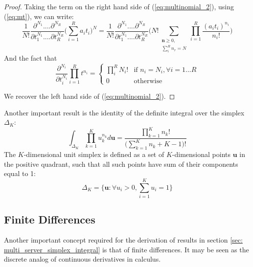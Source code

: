 \begin{proof}
    Taking the term on the right hand side of (\ref{eq:multinomial_2}), using (\ref{eq:mt}), we can write:
    \begin{equation}\label{eq:differentiation_filter}
        \frac{1}{N!} \frac{\partial^{N_1}....\partial^{N_R}}{\partial t_1^{N_1}....\partial t_R^{N_R}}\bigg( \sum_{i=1}^R a_i t_i \bigg)^N = \frac{1}{N!} \frac{\partial^{N_1}....\partial^{N_R}}{\partial t_1^{N_1}....\partial t_R^{N_R}} \bigg( N! \sum_{\substack{\mathbf{n} \geq 0, \\ \sum_i^R n_r = N}}\prod_{i
        =1}^R \frac{(a_i t_i)^{n_i}}{n_i!} \bigg)
    \end{equation}
    And the fact that 
    \begin{equation*}
        \frac{\partial^{N_i}}{\partial t_i ^{N_i}} \prod_{i=1}^R t^{n_i} = 
        \begin{cases}
             \prod_i^R N_i! & \text{if } n_i = N_i, \forall i=1...R \\
            0 & \text{otherwise}
        \end{cases}
    \end{equation*}
    
    We recover the left hand side of (\ref{eq:multinomial_2}).
    
\end{proof}

Another important result is the identity of the definite integral over the simplex \(\Delta_K\):
\begin{equation} \label{eq:dirichlet_simplex_integral}
    \int_{\Delta_K} \prod_{k=1}^K u_k^{n_k} d\mathbf{u} = \frac{\prod_{k=1}^K n_k!}{\big( \sum_{k=1}^K n_k +K -1 \big)!}
\end{equation}
 The \(K\)-dimensional unit simplex is defined as a set of \(K\)-dimensional points \(\mathbf{u}\) in the positive quadrant, such that all such points have sum of their components equal to 1:
 \begin{equation*}
    \Delta_K = \bigg  \{ \mathbf{u} : \forall u_i > 0, \sum_{i=1}^K u_i = 1 \bigg \}
\end{equation*}
\subsection{Finite Differences}

Another important concept required for the derivation of results in section \ref{sec: multi_server_simplex_integral} is that of finite differences. It may be seen as the discrete analog of continuous derivatives in calculus. 

